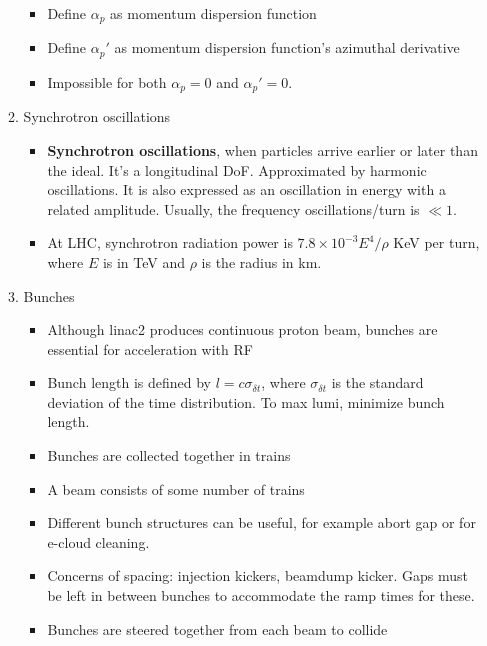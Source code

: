 \begin{itemize}
\begin{enumerate}
\begin{itemize}
            \item Define $\alpha_p$ as momentum dispersion function \cite{bruno}
            \item Define $\alpha_p'$ as momentum dispersion function's azimuthal derivative  \cite{bruno}
            \item Impossible for both $\alpha_p=0$ and $\alpha_p'=0$. \cite{bruno}
        \end{itemize}
        \item Synchrotron oscillations
        \begin{itemize}\scriptsize
            \item \textbf{Synchrotron oscillations}, when particles arrive earlier or later than the ideal. It's a longitudinal DoF. Approximated by harmonic oscillations. It is also expressed as an oscillation in energy with a related amplitude. Usually, the frequency oscillations/turn is $\ll1$. \cite{pdgAccelSection}
            \item At LHC, synchrotron radiation power is $7.8\times10^{-3}E^4/\rho$ KeV per turn, where $E$ is in TeV and $\rho$ is the radius in km. \cite{pdgAccelSection}
        \end{itemize}
        \item Bunches
        \begin{itemize}\scriptsize
            \item Although linac2 produces continuous proton beam, bunches are essential for acceleration with RF
            \item Bunch length is defined by $l=c\sigma_{\delta t}$, where $\sigma_{\delta t}$ is the standard deviation of the time distribution. To max lumi, minimize bunch length.  \cite{pdgAccelSection}
            \item Bunches are collected together in trains
            \item A beam consists of some number of trains
            \item Different bunch structures can be useful, for example abort gap or for e-cloud cleaning.
            \item Concerns of spacing: injection kickers, beamdump kicker. Gaps must be left in between bunches to accommodate the ramp times for these. \cite{boussard}
            \item Bunches are steered together from each beam to collide

\end{itemize}
\end{enumerate}
\end{itemize}
